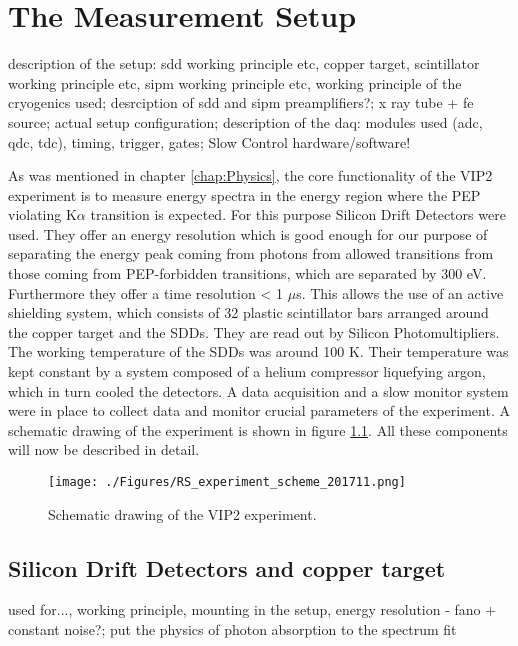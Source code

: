 \chapter{The Measurement Setup}
\label{chap:Setup}

description of the setup: sdd working principle etc, copper target, scintillator working principle etc, sipm working principle etc, working principle of the cryogenics used; desrciption of sdd and sipm preamplifiers?; x ray tube + fe source; actual setup configuration; description of the daq: modules used (adc, qdc, tdc), timing, trigger, gates; Slow Control hardware/software!

As was mentioned in chapter \ref{chap:Physics}, the core functionality of the VIP2 experiment is to measure energy spectra in the energy region where the PEP violating K$\alpha$ transition is expected. For this purpose Silicon Drift Detectors were used. They offer an energy resolution which is good enough for our purpose of separating the energy peak coming from photons from allowed transitions from those coming from PEP-forbidden transitions, which are separated by 300 eV. Furthermore they offer a time resolution < 1 $\mu$s. This allows the use of an active shielding system, which consists of 32 plastic scintillator bars arranged around the copper target and the SDDs. They are read out by Silicon Photomultipliers. The working temperature of the SDDs was around 100 K. Their temperature was kept constant by a system composed of a helium compressor liquefying argon, which in turn cooled the detectors. A data acquisition and a slow monitor system were in place to collect data and monitor crucial parameters of the experiment. A schematic drawing of the experiment is shown in figure \ref{fig:expScheme}. All these components will now be described in detail.
\begin{figure}[h]
 \centering
 \texttt{[image: ./Figures/RS\_experiment\_scheme\_201711.png]}
 \caption{Schematic drawing of the VIP2 experiment.}
 \label{fig:expScheme}
\end{figure}


\section{Silicon Drift Detectors and copper target}
\label{sec:SDDs}

used for..., working principle, mounting in the setup, energy resolution - fano + constant noise?; put the physics of photon absorption to the spectrum fit

